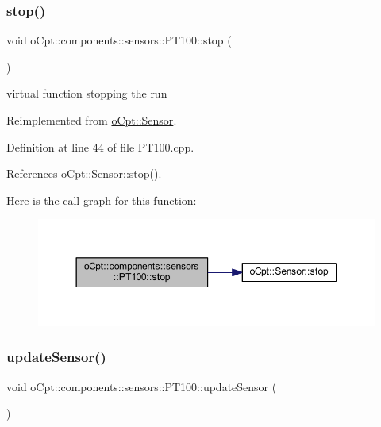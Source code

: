 \subsubsection{\texorpdfstring{stop()}{stop()}}
{\footnotesize\ttfamily void o\+Cpt\+::components\+::sensors\+::\+P\+T100\+::stop (\begin{DoxyParamCaption}{ }\end{DoxyParamCaption})\hspace{0.3cm}{\ttfamily [virtual]}}

virtual function stopping the run 

Reimplemented from \hyperlink{classo_cpt_1_1_sensor_a44ad78c2c091ca9cf72295293f8c5b74}{o\+Cpt\+::\+Sensor}.



Definition at line 44 of file P\+T100.\+cpp.



References o\+Cpt\+::\+Sensor\+::stop().

Here is the call graph for this function\+:\nopagebreak
\begin{figure}[H]
\begin{center}
\leavevmode
\includegraphics[width=350pt]{classo_cpt_1_1components_1_1sensors_1_1_p_t100_a6d80e18a58cf4e1b9b6ce82b441209e2_cgraph}
\end{center}
\end{figure}
\hypertarget{classo_cpt_1_1components_1_1sensors_1_1_p_t100_a66619675288a5344a55242d9bf097aee}{}\label{classo_cpt_1_1components_1_1sensors_1_1_p_t100_a66619675288a5344a55242d9bf097aee} 
\subsubsection{\texorpdfstring{update\+Sensor()}{updateSensor()}}
{\footnotesize\ttfamily void o\+Cpt\+::components\+::sensors\+::\+P\+T100\+::update\+Sensor (\begin{DoxyParamCaption}{ }\end{DoxyParamCaption})\hspace{0.3cm}{\ttfamily [virtual]}}


